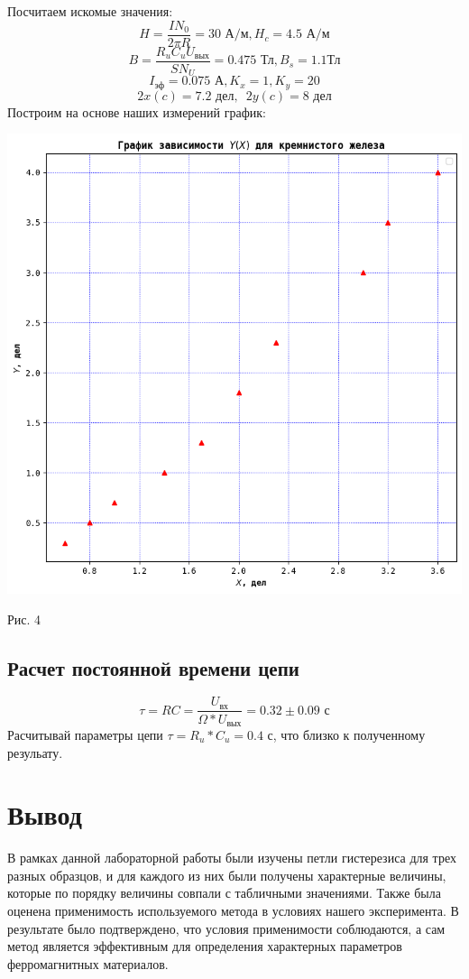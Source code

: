 \documentclass[a4paper, 12pt]{article}
\begin{document}
Посчитаем искомые значения:
$$H = \frac{I N_0}{2 \pi R} = 30 \text{ А/м}, H_c = 4.5\text{ А/м}$$
$$B = \frac{R_u C_u U_\text{вых}}{S N_U} = 0.475 \text{ Тл}, B_s = 1.1 \text{Тл}$$
$$I_\text{эф} = 0.075 \text{ А}, K_x = 1, K_y = 20$$
$$2x(c) = 7.2 \text{ дел}, \phantom 22y(c) = 8 \text{ дел}$$
Построим на основе наших измерений график: 
\begin{center}
    \centering
    \includegraphics[width=0.5\linewidth]{iron_graphic.png}
    \caption{Рис. 4}
    \label{fig:enter-label}
\end{center}
\subsection{Расчет постоянной времени цепи}
$$\tau = RC = \frac{U_\text{вх}}{\Omega * U_\text{вых}} = 0.32 \pm 0.09 \text{ с}$$
Расчитывай параметры цепи $\tau = R_u * C_u = 0.4$ с, что близко к полученному резульату.
\section{Вывод}
В рамках данной лабораторной работы были изучены петли гистерезиса для трех разных образцов, и для каждого из них были получены характерные величины, которые по порядку величины совпали с табличными значениями. Также была оценена применимость используемого метода в условиях нашего эксперимента. В результате было подтверждено, что условия применимости соблюдаются, а сам метод является эффективным для определения характерных параметров ферромагнитных материалов.
\end{document}
